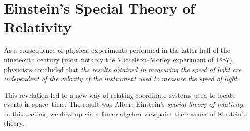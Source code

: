\section{Einstein's Special Theory of Relativity}\label{sec:6.9}

\begin{note}
  As a consequence of physical experiments performed in the latter half of the nineteenth century (most notably the Michelson--Morley experiment of 1887), physicists concluded that \emph{the results obtained in measuring the speed of light are independent of the velocity of the instrument used to measure the speed of light}.

  This revelation led to a new way of relating coordinate systems used to locate events in space--time.
  The result was Albert Einstein's \emph{special theory of relativity}.
  In this section, we develop via a linear algebra viewpoint the essence of Einstein's theory.
\end{note}

